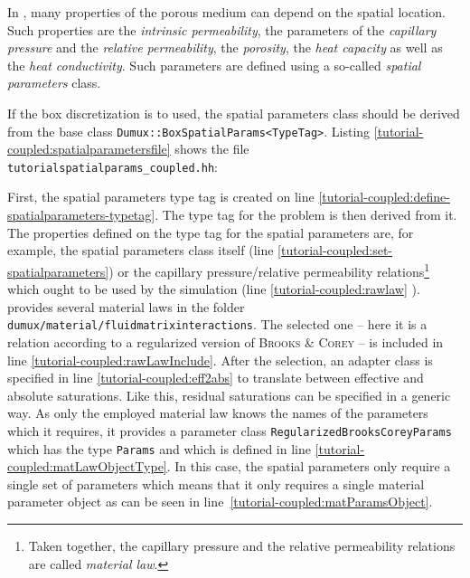 In \Dumux, many properties of the porous medium can depend on the
spatial location. Such properties are the \textit{intrinsic
  permeability}, the parameters of the \textit{capillary pressure} and
the \textit{relative permeability}, the \textit{porosity}, the
\textit{heat capacity} as well as the \textit{heat conductivity}. Such
parameters are defined using a so-called \textit{spatial parameters}
class.

If the box discretization is to used, the spatial parameters class
should be derived from the base class
\texttt{Dumux::BoxSpatialParams<TypeTag>}. Listing
\ref{tutorial-coupled:spatialparametersfile} shows the file \\
\verb+tutorialspatialparams_coupled.hh+:

\begin{lst}\label{tutorial-coupled:spatialparametersfile} \mbox{}

\end{lst}

First, the spatial parameters type tag is created on line
\ref{tutorial-coupled:define-spatialparameters-typetag}. The type tag
for the problem is then derived from it. The \Dumux properties defined on
the type tag for the spatial parameters are, for example, the spatial
parameters class itself (line
\ref{tutorial-coupled:set-spatialparameters}) or the capillary
pressure/relative permeability relations\footnote{Taken together, the
  capillary pressure and the relative permeability relations are
  called \textit{material law}.} which ought to be used by the
simulation (line
\ref{tutorial-coupled:rawlaw} \label{tutorial-coupled:materialLaw}).
\Dumux provides several material laws in the folder
\verb+dumux/material/fluidmatrixinteractions+.  The selected one --
here it is a relation according to a regularized version of
\textsc{Brooks} \& \textsc{Corey} -- is included in line
\ref{tutorial-coupled:rawLawInclude}. 
After the selection, an adapter class is specified in line \ref{tutorial-coupled:eff2abs} to
translate between effective and absolute saturations. Like this,
residual saturations can be specified in a generic way.  As only the employed
material law knows the names of the parameters which it
requires, it provides a parameter class
\texttt{RegularizedBrooksCoreyParams} which has the type
\texttt{Params} and which is defined in line
\ref{tutorial-coupled:matLawObjectType}. In this case, the spatial
parameters only require a single set of parameters which means that it
only requires a single material parameter object as can be seen in
line~\ref{tutorial-coupled:matParamsObject}.

